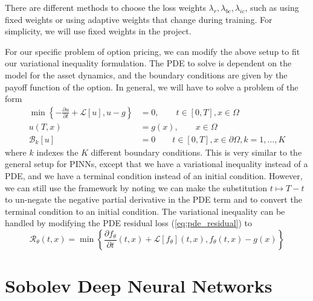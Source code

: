 There are different methods to choose the loss weights $\lambda_r, \lambda_{bc}, \lambda_{ic}$, such as using fixed weights or using adaptive weights that change during training. For simplicity, we will use fixed weights in the project.

For our specific problem of option pricing, we can modify the above setup to fit our variational inequality formulation. The PDE to solve is dependent on the model for the asset dynamics, and the boundary conditions are given by the payoff function of the option. In general, we will have to solve a problem of the form
\begin{align}
    \min\left\{ -\frac{\partial u}{\partial t} + \mathcal L[u], u - g \right\} &= 0, \qquad t \in [0, T], x \in \Omega \label{eq:pinn_pde}\\
    u(T, x) &= g(x), \qquad x \in \Omega \label{eq:pinn_terminal}\\
    \mathcal B_k[u] &= 0 \qquad t \in [0, T], x \in \partial \Omega, k=1, \dots, K \label{eq:pinn_boundary}
\end{align}
where $k$ indexes the $K$ different boundary conditions. This is very similar to the general setup for PINNs, except that we have a variational inequality instead of a PDE, and we have a terminal condition instead of an initial condition. However, we can still use the framework by noting we can make the substitution $t \mapsto T-t$ to un-negate the negative partial derivative in the PDE term and to convert the terminal condition to an initial condition. The variational inequality can be handled by modifying the PDE residual loss (\ref{eq:pde_residual}) to
\begin{equation}
    \mathcal R_\theta(t, x) = \min\left\{ \frac{\partial f_\theta}{\partial t}(t, x) + \mathcal L[f_\theta](t, x), f_\theta(t, x) - g(x) \right\}
\end{equation}

\section{Sobolev Deep Neural Networks}